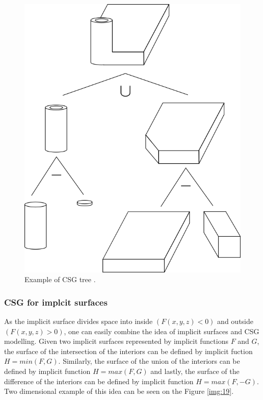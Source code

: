 \begin{figure}
    \centerline{\includegraphics[scale=0.5]{images/img18}}
    \caption[Example of CSG tree]
    {Example of CSG tree \cite{foley1996computer}.}
    \label{img:18}
\end{figure}

\subsubsection*{CSG for implcit surfaces}
As the implicit surface divides space into inside $(F(x, y, z) < 0)$ and
outside $(F(x, y, z) > 0)$, one can easily combine the idea of
implicit surfaces and CSG modelling. Given two implicit surfaces represented
by implicit functions $F$ and $G$, the surface of the
intersection of the interiors can be defined by implicit fuction $H=min(F, G)$.
Similarly, the surface of the union of the interiors can be defined
by implicit function $H=max(F, G)$ and lastly, the surface of the difference of
the interiors can be defined by implicit function $H=max(F, -G)$. Two dimensional
example of this idea can be seen on the Figure \ref{img:19}.

